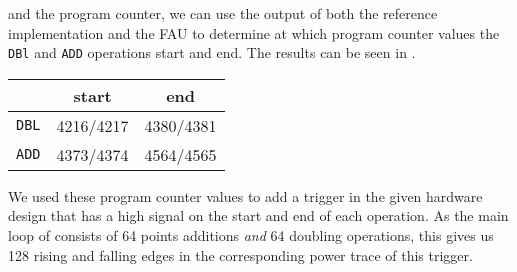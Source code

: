 %
and the program counter, we can use the output of both the reference implementation and the FAU to determine at which program counter values the \texttt{DBl} and \texttt{ADD} operations start and end.
The results can be seen in .
%
\begin{table}
	\centering
	\begin{tabular}{*3c}
		\toprule
		& \textbf{start} & \textbf{end} \\
		\midrule
		\texttt{DBL} & 4216/4217 & 4380/4381 \\
		\texttt{ADD} & 4373/4374 & 4564/4565 \\
		\bottomrule
	\end{tabular}
	\label{tbl: FourQ DBL/ADD start/end values}
\end{table}
%
We used these program counter values to add a trigger in the given hardware design that has a high signal on the start and end of each operation.
As the main loop of {\fourq} consists of 64 points additions \emph{and} 64 doubling operations, this gives us 128 rising and falling edges in the corresponding power trace of this trigger.

